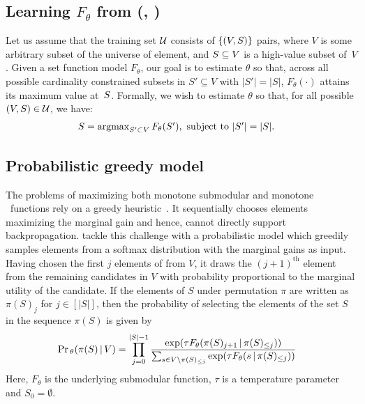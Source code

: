 \documentclass{article}
\DeclareMathOperator*{\argmax}{argmax}
\renewcommand{\cite}{\citep}
\begin{document}
\subsection{Learning $F_{\theta}$ from (\tuniv, \thigh)}

Let us assume that the training set $\mathcal{U}$ consists of $\{(V,S)\}$ pairs, where $V$ is some arbitrary subset of the universe of element, and $S \subseteq V$ is a high-value subset of~$V$.
Given a set function model $F_{\theta}$, our goal is to estimate $\theta$ so that,
across all possible cardinality constrained subsets in $S'\subseteq V$
 with $|S'|=|S|$,
$F_{\theta}(\cdot)$ attains its maximum value at~$S$.
Formally, we wish to estimate $\theta$ so that,
for all possible $(V,S)\in \mathcal{U}$, we have:
\begin{align}
\St &= \textstyle \argmax_{S' \subset V}\F(S'), \ \text{subject to} \ |S'| = |\St|. 
\label{eq:pr-st}
\end{align}

\subsection{Probabilistic greedy model}
\label{sec:sec:prob-greedy}

The problems of maximizing  both monotone submodular and monotone \asb\ functions rely on a greedy heuristic~\cite{nemhauser1978analysis}.
It sequentially chooses elements maximizing the marginal gain and hence, cannot directly support backpropagation.  \citet{tschiatschek2018differentiable} tackle this challenge with a probabilistic model which greedily samples elements
from a softmax distribution with the marginal gains as input. Having chosen the first $j$ elements of \thigh{} from \tuniv{} $V$, it draws the $(j+1)^{\text{th}}$ element from the remaining candidates in $V$ with probability proportional to the marginal utility of the candidate. If the elements of $S$ under permutation $\pi$ are written as $\pi(S)_j$  for $j\in[|S|]$, then the probability of selecting the elements of the set $S$ in the sequence $\pi(S)$ is given by
\begin{align}
 &\mathop{\mathrm{Pr}}{}_\theta (\pi(S)\,|\, V) 
=\prod_{j=0} ^{|S|-1} \frac{\exp(\tau F_{\theta} (\pi(S)_{j+1} \,|\, \pi(S)_{\le j}))}{\sum_{s\in V\backslash \pi(S)_{\le j}}
 \exp(\tau F_{\theta} (s \,|\, \pi(S)_{\le j}))} \label{eq:greedy}
\end{align}
Here, $F_{\theta}$ is the underlying submodular  function, $\tau$ is a temperature parameter and $S_{0} = \emptyset$.
\end{document}
